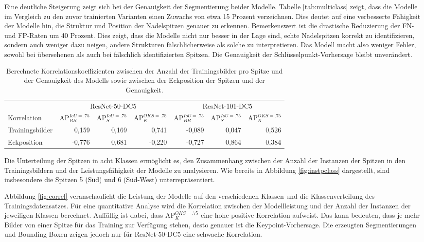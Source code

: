 Eine deutliche Steigerung zeigt sich bei der Genauigkeit der Segmentierung beider Modelle. Tabelle \ref{tab:multiclass} zeigt, dass die Modelle im Vergleich zu den zuvor trainierten Varianten einen Zuwachs von etwa 15 Prozent verzeichnen. Dies deutet auf eine verbesserte Fähigkeit der Modelle hin, die Struktur und Position der Nadelspitzen genauer zu erkennen.
Bemerkenswert ist die drastische Reduzierung der FN- und FP-Raten um 40 Prozent. Dies zeigt, dass die Modelle nicht nur besser in der Lage sind, echte Nadelspitzen korrekt zu identifizieren, sondern auch weniger dazu neigen, andere Strukturen fälschlicherweise als solche zu interpretieren. Das Modell macht also weniger Fehler, sowohl bei übersehenen als auch bei fälschlich identifizierten Spitzen.
Die Genauigkeit der Schlüsselpunkt-Vorhersage bleibt unverändert.

\begin{table}[h]
    \centering
    \begin{tabular}{lrrr|rrr}
        \toprule
         & \multicolumn{3}{c}{ResNet-50-DC5} & \multicolumn{3}{c}{ResNet-101-DC5} \\
        Korrelation & $\text{AP}^{IoU=.75}_{BB}$ & $\text{AP}^{IoU=.75}_{S}$ & $\text{AP}^{OKS=.75}_{K}$ & $\text{AP}^{IoU=.75}_{BB}$ & $\text{AP}^{IoU=.75}_{S}$ & $\text{AP}^{OKS=.75}_{K}$ \\
        \midrule
        Trainingsbilder & 0,159 & 0,169 & 0,741 & -0,089 & 0,047 & 0,526\\
        Eckposition & -0,776 & 0,681 & -0,220 & -0,727 & 0,864 & 0,384\\ 
        \bottomrule
    \end{tabular}
    \caption{Berechnete Korrelationskoeffizienten zwischen der Anzahl der Trainingsbilder pro Spitze und der Genauigkeit des Modells sowie zwischen der Eckposition der Spitzen und der Genauigkeit.}
    \label{tab:correl}
\end{table}
Die Unterteilung der Spitzen in acht Klassen ermöglicht es, den Zusammenhang zwischen der Anzahl der Instanzen der Spitzen in den Trainingsbildern und der Leistungsfähigkeit der Modelle zu analysieren. Wie bereits in Abbildung \ref{fig:instpclass} dargestellt, sind insbesondere die Spitzen 5 (Süd) und 6 (Süd-West) unterrepräsentiert.

Abbildung \ref{fig:correl} veranschaulicht die Leistung der Modelle auf den verschiedenen Klassen und die Klassenverteilung des Trainingsdatensatzes. Für eine quantitative Analyse wird die Korrelation zwischen der Modellleistung und der Anzahl der Instanzen der jeweiligen Klassen berechnet.
Auffällig ist dabei, dass $\text{AP}^{OKS=.75}_{K}$ eine hohe positive Korrelation aufweist. Das kann bedeuten, dass je mehr Bilder von einer Spitze für das Training zur Verfügung stehen, desto genauer ist die Keypoint-Vorhersage. Die erzeugten Segmentierungen und Bounding Boxen zeigen jedoch nur für ResNet-50-DC5 eine schwache Korrelation.

